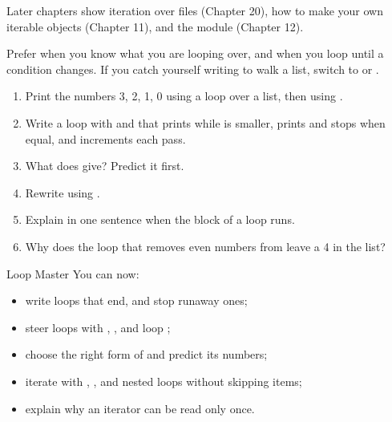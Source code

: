 Later chapters show iteration over files (Chapter 20), how to make your own iterable objects
(Chapter 11), and the  module (Chapter 12).

\begin{gamerule}
Prefer  when you know what you are looping over, and  when you loop until a condition
changes. If you catch yourself writing  to walk a list, switch to  or
.
\end{gamerule}

\begin{practice}
\begin{enumerate}
\item Print the numbers 3, 2, 1, 0 using a  loop over a list, then using .
\item Write a  loop with  and  that prints
 while  is smaller, prints  and stops when equal, and
increments  each pass.
\item What does  give? Predict it first.
\item Rewrite  using .
\item Explain in one sentence when the  block of a  loop runs.
\item Why does the loop that removes even numbers from \code{[2, 4, 6, 7]} leave a 4 in the list?
\end{enumerate}
\end{practice}

\begin{achievement}{Loop Master}
You can now:
\begin{itemize}
\item write  loops that end, and stop runaway ones;
\item steer loops with , , and loop ;
\item choose the right form of  and predict its numbers;
\item iterate with , , and nested loops without skipping items;
\item explain why an iterator can be read only once.
\end{itemize}
\end{achievement}
